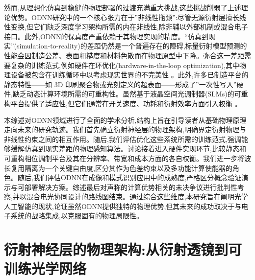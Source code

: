 \documentclass[11pt]{article}
\begin{document}
然而,从理想化仿真到稳健的物理部署的过渡充满重大挑战,这些挑战削弱了上述理论优势。ODNN研究中的一个核心张力在于''非线性瓶颈'':尽管无源衍射层擅长线性变换,但它们缺乏深度学习架构所需的内在非线性,除非辅以外部机制或混合电子接口。此外,ODNN的保真度严重依赖于其物理实现的精度。``仿真到现实''(simulation-to-reality)的差距仍然是一个普遍存在的障碍,标量衍射模型预测的性能会因制造公差、表面粗糙度和材料色散而在物理原型中下降。弥合这一差距需要复杂的训练范式,例如硬件在环优化(hardware-in-the-loop optimization),其中物理设备被包含在训练循环中以考虑现实世界的不完美性 \citep{doi_10_1117_12_3013482_d44587c1}。此外,许多已制造平台的静态特性------如 3D 印刷聚合物或光刻定义的超表面------形成了''一次性写入''硬件,缺乏动态计算环境所需的可重构性。虽然基于液晶空间光调制器(SLMs)的可重构平台提供了适应性,但它们通常在开关速度、功耗和衍射效率方面引入权衡 \citep{doi_10_1002_adom_202300561_c4d7a5b0}。

本综述对ODNN领域进行了全面的学术分析,结构上旨在引导读者从基础物理原理走向未来的研究轨迹。我们首先确立衍射神经层的物理架构,明确界定衍射物理与非线性约束之间的相互作用。随后,我们评估优化这些系统所需的训练范式,强调能够缓解仿真到现实差距的物理感知算法。讨论接着进入硬件实现环节,比较静态和可重构相位调制平台及其在分辨率、带宽和成本方面的各自权衡。我们进一步将波长复用隔离为一个关键自由度,区分其作为色差约束以及多功能计算使能器的角色。随后,我们评估ODNN在成像和模式识别应用中的成熟度,严格区分概念验证演示与可部署解决方案。综述最后对声称的计算优势相关的未决争议进行批判性考察,并以混合电光协同设计的路线图结束。通过综合这些维度,本研究旨在阐明光学人工智能的现状,论证虽然ODNN提供独特的物理优势,但其未来的成功取决于与电子系统的战略集成,以克服固有的物理局限性。

\section{衍射神经层的物理架构:从衍射透镜到可训练光学网络}\label{ux884dux5c04ux795eux7ecfux5c42ux7684ux7269ux7406ux67b6ux6784ux4eceux884dux5c04ux900fux955cux5230ux53efux8badux7ec3ux5149ux5b66ux7f51ux7edc}
\end{document}
